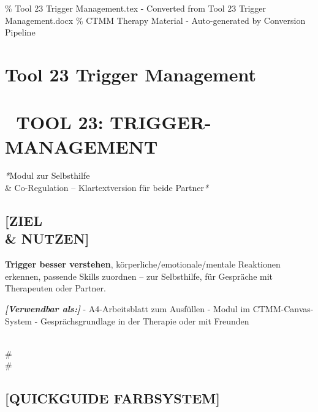 \% Tool 23 Trigger Management.tex - Converted from Tool 23 Trigger Management.docx
\% CTMM Therapy Material - Auto-generated by Conversion Pipeline

\section{Tool 23 Trigger Management}
\label{sec:tool-23-trigger-management}

\section{📄 \textbf{TOOL 23: TRIGGER-MANAGEMENT}}

\textcolor{ctmmBlue}{\faPuzzlePiece} \textit{*}Modul zur Selbsthilfe \\& Co-Regulation -- Klartextversion für beide
Partner\textit{*}

\subsection{\textcolor{ctmmGreen}{\faBullseye} \textbf{[ZIEL \\& NUTZEN]}}

\textbf{\textcolor{ctmmRed}{Trigger} besser verstehen}, körperliche/emotionale/mentale Reaktionen
erkennen, passende Skills zuordnen -- zur Selbsthilfe, für Gespräche mit
Therapeuten oder Partner.

\textcolor{ctmmYellow}{\faLightbulb} \textbf{\textit{[Verwendbar als:]}} - A4-Arbeitsblatt zum Ausfüllen -
Modul im \textcolor{ctmmBlue}{CTMM}-Canvas-System - Gesprächsgrundlage in der Therapie oder
mit Freunden

\\#\\#

\subsection{\textcolor{ctmmOrange}{\faCompass} \textbf{[QUICKGUIDE FARBSYSTEM]}}

